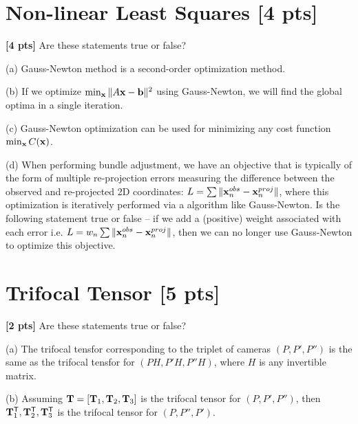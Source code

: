 \documentclass[11pt,addpoints,answers]{exam}
\numberwithin{equation}{section} %
\numberwithin{figure}{section} %
\numberwithin{table}{section} %
\begin{document}
\begin{questions}
\begin{tcolorbox}[fit,height=4.5cm, width=\textwidth, blank, borderline={0.5pt}{-2pt},halign=left, valign=center, nobeforeafter]

\end{tcolorbox}

\section{Non-linear Least Squares [4 pts]}

\question \textbf{[4 pts]} Are these statements true or false?  

(a) Gauss-Newton method is a second-order optimization method.

(b) If we optimize $\min_{\mathbf{x}} \|A\mathbf{x}-\mathbf{b}\|^2$ using Gauss-Newton, we will find the global optima in a single iteration. 

(c) Gauss-Newton optimization can be used for minimizing any cost function $\min_{\mathbf{x}} C(\mathbf{x})$.

(d) When performing bundle adjustment, we have an objective that is typically of the form of multiple re-projection errors measuring the difference between the observed and re-projected 2D coordinates: $L = \sum \| \mathbf{x}^{obs}_{n} - \mathbf{x}^{proj}_n \|$, where this optimization is iteratively performed via a algorithm like Gauss-Newton. Is the following statement true or false -- if we  add a (positive) weight associated with each error i.e. $L = w_n \sum \| \mathbf{x}^{obs}_{n} - \mathbf{x}^{proj}_n \|$, then we can no longer use Gauss-Newton to optimize this objective.

\begin{tcolorbox}[fit,height=5cm, width=\textwidth, blank, borderline={0.5pt}{-2pt},halign=left, valign=center, nobeforeafter]


\end{tcolorbox}

\newpage

\section{Trifocal Tensor [5 pts]}

\question \textbf{[2 pts]} Are these statements true or false?  

(a) The trifocal tensfor corresponding to the triplet of cameras $(P, P', P'')$ is the same as the trifocal tensfor for $(PH, P'H, P''H)$, where $H$ is any invertible matrix.

(b) Assuming $\mathbf{T} = [\mathbf{T}_1, \mathbf{T}_2, \mathbf{T}_3]$ is the trifocal tensor for $(P, P', P'')$, then $ \mathbf{T}_1^{\mathsf{T}}, \mathbf{T}_2^{\mathsf{T}}, \mathbf{T}_3^{\mathsf{T}}$ is the trifocal tensor for $(P, P'', P')$. 


\end{questions}
\end{document}
